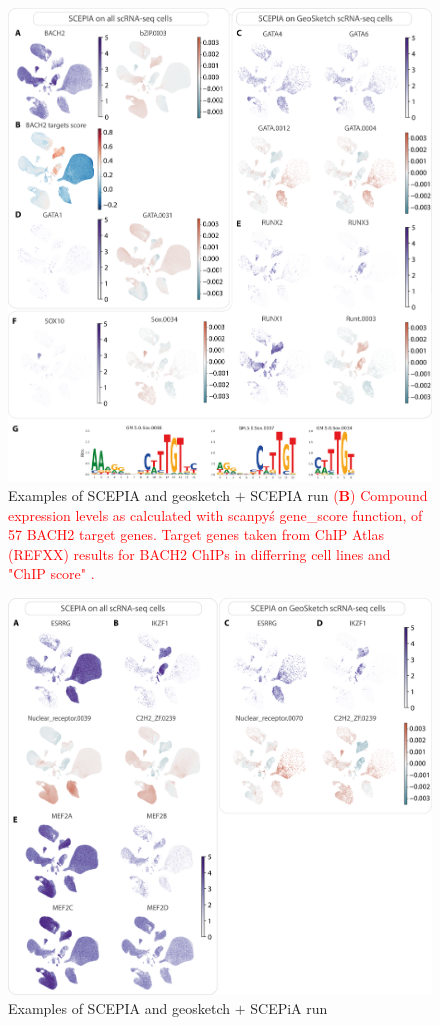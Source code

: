 \begin{figure}
    \centering
    \includegraphics[height=1\linewidth]{ch.scepia/imgs/SCEPIA_SCEPIAGEO_BiologicalExamples_Myriad_v9_SuppFigFeatures1.png}
    \caption{Examples of SCEPIA and geosketch $+$ SCEPIA run \textcolor{red}{(\textbf{B}) Compound expression levels as calculated with scanpy\'s gene\_score function, of 57 BACH2 target genes. Target genes taken from ChIP Atlas (REFXX) results for BACH2 ChIPs in differring cell lines and "ChIP score" .}}
    \label{fig:scepia_features1}
\end{figure}

\begin{figure}
    \centering
    \includegraphics[height=0.666\linewidth]{ch.scepia/imgs/SCEPIA_SCEPIAGEO_BiologicalExamples_Myriad_v4_SuppFigFeatures2.png}
    \caption{Examples of SCEPIA and geosketch $+$ SCEPiA run}
    \label{fig:scepia_features2}
\end{figure}
